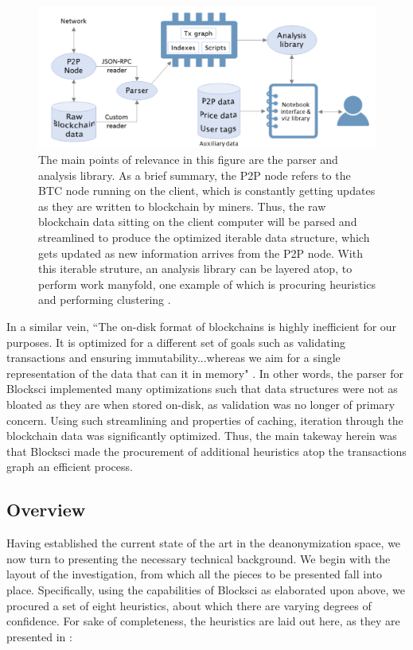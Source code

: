 \documentclass{article}
\begin{document}
\begin{figure}
    \centering
    \includegraphics[width=.75\textwidth]{blocksci.png}
    \caption[Blocksci Architecture]{The main points of relevance in this figure are the parser and analysis library. As a brief summary, the P2P node refers to the BTC node running on the client, which is constantly getting updates as they are written to blockchain by miners. Thus, the raw blockchain data sitting on the client computer will be parsed and streamlined to produce the optimized iterable data structure, which gets updated as new information arrives from the P2P node. With this iterable struture, an analysis library can be layered atop, to perform work manyfold, one example of which is procuring heuristics and performing clustering \cite{blocksci}.}
    \label{fig:blocksci}
\end{figure}

In a similar vein, ``The on-disk format of blockchains is highly inefficient for our purposes. It is optimized for a different set of goals such as validating transactions and ensuring immutability...whereas we aim for a single representation of the data that can it in memory" \cite{blocksci}. In other words, the parser for Blocksci implemented many optimizations such that data structures were not as bloated as they are when stored on-disk, as validation was no longer of primary concern. Using such streamlining and properties of caching, iteration through the blockchain data was significantly optimized. Thus, the main takeway herein was that Blocksci made the procurement of additional heuristics atop the transactions graph an efficient process.

\subsection{Overview}
Having established the current state of the art in the deanonymization space, we now turn to presenting the necessary technical background. We begin with the layout of the investigation, from which all the pieces to be presented fall into place. Specifically, using the capabilities of Blocksci as elaborated upon above, we procured a set of eight heuristics, about which there are varying degrees of confidence. For sake of completeness, the heuristics are laid out here, as they are presented in \cite{heuristics}:
\end{document}

